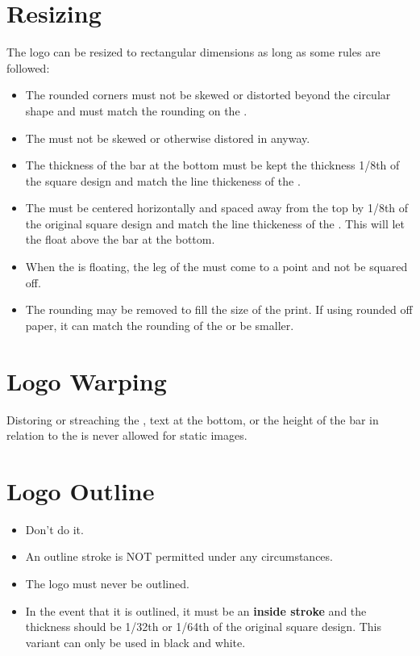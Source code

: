 \documentclass{logo_styleguide}
\begin{document}
\section{Resizing}
The logo can be resized to rectangular dimensions as long as some rules are followed:
\begin{itemize}
    \item The rounded corners must not be skewed or distorted beyond the circular shape and must match the rounding on the \grchar.
    \item The \grchar\hspace{0.125em} must not be skewed or otherwise distored in anyway.
    \item The thickness of the bar at the bottom must be kept the thickness 1/8th of the square design and match the line thickeness of the \gchar.
    \item The \grchar\hspace{0.125em} must be centered horizontally and spaced away from the top by 1/8th of the original square design and match the line thickeness of the \gchar. This will let the \grchar\hspace{0.125em} float above the bar at the bottom.
    \item When the \rchar\hspace{0.125em} is floating, the leg of the \rchar\hspace{0.125em} must come to a point and not be squared off.
    \item The rounding may be removed to fill the size of the print. If using rounded off paper, it can match the rounding of the \grchar\hspace{0.125em} or be smaller.
\end{itemize}

\logoresizing



\section{Logo Warping}
Distoring or streaching the \grchar, text at the bottom, or the height of the bar in relation to the
\grchar\hspace{0.125em} is never allowed for static images.

\logowarped



\section{Logo Outline}
\begin{itemize}
    \item Don't do it.
    \item An outline stroke is NOT permitted under any circumstances.
    \item The logo must never be outlined.
    \item In the event that it is outlined, it must be an \textbf{inside stroke} and the thickness should be 1/32th or 1/64th of the original square design. This variant can only be used in black and white.
\end{itemize}
\end{document}
